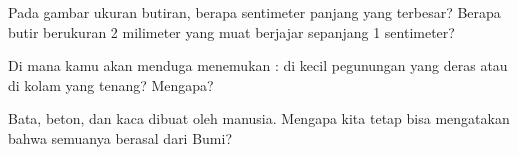 \begin{exercise}[$\star\star$]\label{exo:g3:stones-pebbles-sand:8}
Pada gambar ukuran butiran, berapa sentimeter panjang  yang terbesar?
Berapa butir  berukuran 2 milimeter yang muat berjajar sepanjang 1
sentimeter?
\end{exercise}

\begin{exercise}[$\star\star$]\label{exo:g3:stones-pebbles-sand:9}
Di mana kamu akan menduga menemukan : di  kecil pegunungan yang
deras atau di kolam yang tenang? Mengapa?
\end{exercise}

\begin{exercise}[$\star\star$]\label{exo:g3:stones-pebbles-sand:10}
Bata, beton, dan kaca dibuat oleh manusia. Mengapa kita tetap bisa
mengatakan bahwa semuanya berasal dari  Bumi?
\end{exercise}
